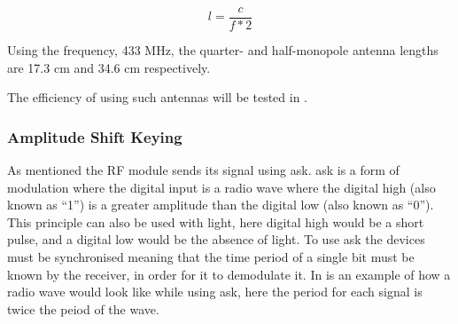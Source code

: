 \begin{equation}
l = \frac{c}{f * 2}
\end{equation}

Using the frequency, 433 MHz, the quarter- and half-monopole antenna lengths are 17.3 cm and 34.6 cm respectively.
\cite{AntennaLength}

The efficiency of using such antennas will be tested in .

\subsubsection{Amplitude Shift Keying}

As mentioned the RF module sends its signal using \gls{ask}.
\gls{ask} is a form of modulation where the digital input is a radio wave where the digital high (also known as ``1'') is a greater amplitude than the digital low (also known as ``0'').
This principle can also be used with light, here digital high would be a short pulse, and a digital low would be the absence of light. 
To use \gls{ask} the devices must be synchronised meaning that the time period of a single bit must be known by the receiver, in order for it to demodulate it. 
In  is an example of how a radio wave would look like while using \gls{ask}, here the period for each signal is twice the peiod of the wave. \cite{ASKnFSK}

